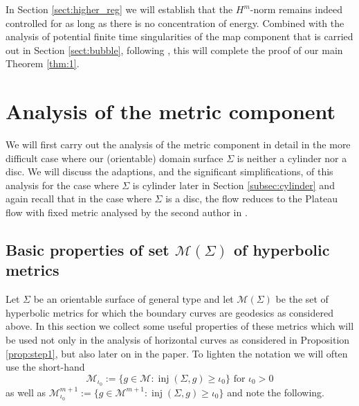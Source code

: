 \documentclass[10pt,reqno]{amsart}
\theoremstyle{plain}
\theoremstyle{definition}
\numberwithin{equation}{section}
\newcommand{\Si}{\Sigma}
\DeclareMathOperator{\inj}{inj}
\newcommand{\beq}{\begin{equation}}
\newcommand{\eeq}{\end{equation}}
\newcommand{\MM}{\mathcal{M}} %
\newcommand{\MMiota}{\MM_{\iota_0}}
\begin{document}
In Section \ref{sect:higher_reg}  we will establish that the $H^m$-norm remains indeed controlled for as long as there is no concentration of energy. Combined with the analysis of potential finite time singularities of the map component that is carried out in Section \ref{sect:bubble}, following \cite{S}, this will complete the proof of our main Theorem \ref{thm:1}.




\section{Analysis of the metric component}\label{sect:metric}
We will first carry out the analysis of the metric component in detail in the more difficult case where our (orientable) domain surface $\Si$ is neither a cylinder nor a disc. We will discuss the adaptions, and the significant simplifications, of this analysis for the case where $\Si$ is cylinder later in Section \ref{subsec:cylinder} and again recall that in the case where $\Si$ is a disc, the flow reduces to the Plateau flow with fixed metric analysed by the second author in \cite{S}.  

\subsection{Basic properties of set $\MM(\Si)$ of hyperbolic metrics}\label{subsec:metric-basic} 
Let $\Si$ be an orientable surface of general type and let $\MM(\Si)$ be the set of hyperbolic metrics for which the boundary curves are geodesics as considered above. In this section we collect some useful properties of these metrics which will be used not only in the analysis of horizontal curves as considered in Proposition \ref{prop:step1}, but also later on in the paper. To lighten the notation we will often use the short-hand 
\beq\label{def:Miota}
    \MMiota:= \{g\in \MM: \inj(\Si, g)\geq \iota_0\} \text{ for }\iota_0>0 
\eeq
as well as $\MMiota^{m+1}:= \{g\in \MM^{m+1}: \inj(\Si, g)\geq \iota_0\} $ and note the following.
\end{document}
